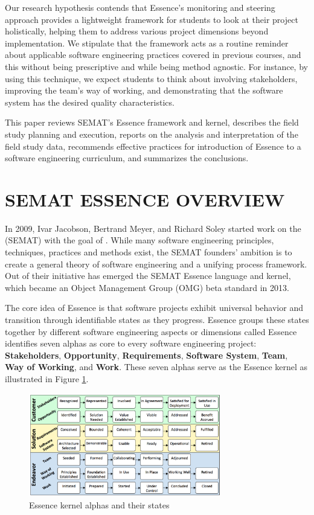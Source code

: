 Our research hypothesis contends that Essence's monitoring and steering approach provides a lightweight framework for students to look at their project holistically, helping them to address various project dimensions beyond implementation. We stipulate that the framework acts as a routine reminder about applicable software engineering practices covered in previous courses, and this without being prescriptive and while being method agnostic. For instance, by using this technique, we expect students to think about involving stakeholders, improving the team's way of working, and demonstrating that the software system has the desired quality characteristics.

This paper reviews SEMAT's Essence framework and kernel, describes the field study planning and execution, reports on the analysis and interpretation of the field study data, recommends effective practices for introduction of Essence to a software engineering curriculum, and summarizes the conclusions.

\section{SEMAT ESSENCE OVERVIEW}
In 2009, Ivar Jacobson, Bertrand Meyer, and Richard Soley started work on the  (SEMAT) with the goal of  \cite{JacobsonCallForAction}. While many software engineering principles, techniques, practices and methods exist, the SEMAT founders' ambition is to create a general theory of software engineering and a unifying process framework. Out of their initiative has emerged the SEMAT Essence language and kernel, which became an Object Management Group (OMG) beta standard in 2013.

The core idea of Essence is that software projects exhibit universal behavior and transition through identifiable states as they progress. Essence groups these states together by different software engineering aspects or dimensions called  Essence identifies seven alphas as core to every software engineering project: \textbf{Stakeholders}, \textbf{Opportunity}, \textbf{Requirements}, \textbf{Software System}, \textbf{Team}, \textbf{Way of Working}, and \textbf{Work}. These seven alphas serve as the Essence kernel as illustrated in Figure \ref{EssenceKernel}.

\begin{figure}[h]
\centering
\includegraphics[width=3.30in]{project_steering_images/EssenceKernel.png}
\caption{Essence kernel alphas and their states }
\label{EssenceKernel}
\end{figure}

